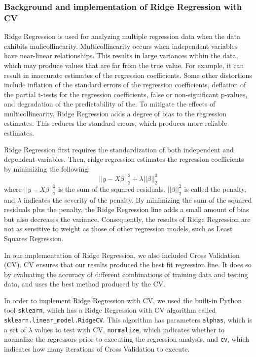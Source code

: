 \documentclass{article}
\begin{document}
\subsubsection{Background and implementation of Ridge Regression with CV}
Ridge Regression is used for analyzing multiple regression data when the data exhibits mulicollinearity. Multicollinearity occurs when independent variables have near-linear relationships. This results in large variances within the data, which may produce values that are far from the true value. For example, it can result in inaccurate estimates of the regression coefficients. Some other distortions include inflation of the standard errors of the regression coefficients, deflation of the partial t-tests for the regression coefficients, false or non-significant p-values, and degradation of the predictability of the. To mitigate the effects of multicollinearity, Ridge Regression adds a degree of bias to the regression estimates. This reduces the standard errors, which produces more reliable estimates.\cite{RidgeReg:2018}

Ridge Regression first requires the standardization of both independent and dependent variables. Then, ridge regression estimates the regression coefficients by minimizing the following:
\begin{equation} \label{RidgeRegEq}
    ||y-X\beta||_2^2+\lambda||\beta||_2^2
\end{equation}
where $||y-X\beta||_2^2$ is the sum of the squared residuals, $||\beta||_2^2$ is called the penalty, and $\lambda$ indicates the severity of the penalty. By minimizing the sum of the squared residuals plus the penalty, the Ridge Regression line adds a small amount of bias but also decreases the variance. Consequently, the results of Ridge Regression are not as sensitive to weight as those of other regression models, such as Least Squares Regression.\cite{RidgeReg:2018}

In our implementation of Ridge Regression, we also included Cross Validation (CV). CV ensures that our results produced the best fit regression line. It does so by evaluating the accuracy of different combinations of training data and testing data, and uses the best method produced by the CV.

In order to implement Ridge Regression with CV, we used the built-in Python tool \texttt{sklearn}, which has a Ridge Regression with CV algorithm called \texttt{sklearn.linear\_model.RidgeCV}. This algorithm has parameters \texttt{alphas}, which is a set of $\lambda$ values to test with CV, \texttt{normalize}, which indicates whether to normalize the regressors prior to executing the regression analysis, and \texttt{cv}, which indicates how many iterations of Cross Validation to execute.
\end{document}
